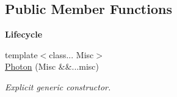 \subsection*{Public Member Functions}
\begin{Indent}{\bf Lifecycle}\par
\begin{DoxyCompactItemize}
\item 
{\footnotesize template$<$class... Misc$>$ }\\\hyperlink{exceptionPhoton_a1f19ea883bc2ed2e8af37e0599e54c00}{Photon} (Misc \&\&...misc)
\begin{DoxyCompactList}\small\item\em Explicit generic constructor. \end{DoxyCompactList}\end{DoxyCompactItemize}
\end{Indent}

